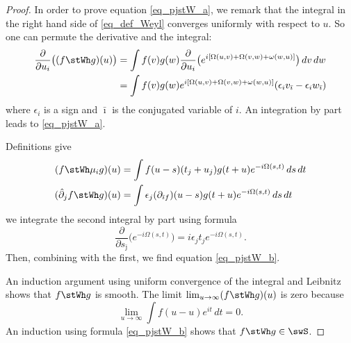 \begin{proof}
	In order to prove equation \eqref{eq_pjstW_a}, we remark that the integral in the right hand side of \eqref{eq_def_Weyl} converges uniformly with respect to $u$. So one can permute the derivative and the integral:
	\[
		\begin{split}
			\frac{ \partial }{ \partial u_i }\big( (f\stWh g)(u) \big)&=\int f(v)g(w)\frac{ \partial }{ \partial u_i }\big( e^{i[\Omega(u,v)+\Omega(v,w)+\omega(w,u)]} \big)\,dv\,dw\\
			&=\int f(v)g(w)e^{i[\Omega(u,v)+\Omega(v,w)+\omega(w,u)]}(\epsilon_i v_{\bar\imath}-\epsilon_i w_{\bar\imath})
		\end{split}
	\]
	where $\epsilon_i$ is a sign and $\bar\imath$ is the conjugated variable of $i$. An integration by part leads to \eqref{eq_pjstW_a}.

	Definitions give
	\begin{subequations}
		\begin{align}
			(f\stWh \mu_ig)(u)          & =\int f(u-s)(t_j+u_j)g(t+u)e^{-i\Omega(s,t)}\,ds\,dt                          \\
			(\hat\partial_jf\stWh g)(u) & =\int \epsilon_j(\partial_{\bar\imath f})(u-s)g(t+u)e^{-i\Omega(s,t)}\,ds\,dt
		\end{align}
	\end{subequations}
	we integrate the second integral by part using formula
	\[
		\frac{ \partial }{ \partial s_{\bar\jmath} }\big( e^{-i\Omega(s,t)} \big)=i\epsilon_jt_je^{-i\Omega(s,t)}.
	\]
	Then, combining with the first, we find equation \eqref{eq_pjstW_b}.

	An induction argument using uniform convergence of the integral and Leibnitz shows that $f\stWh g$ is smooth. The limit $\lim_{u\to\infty}(f\stWh g)(u)$ is zero because
	\[
		\lim_{u\to\infty}\int f(u-u)e^{it}\,dt=0.
	\]
	An induction using formula  \eqref{eq_pjstW_b} shows that $f\stWh g\in\swS$.


\end{proof}
